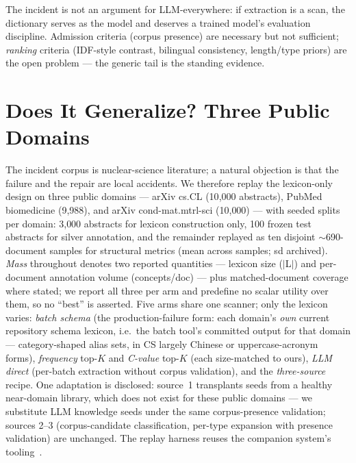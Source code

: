 \documentclass[sigconf,nonacm,anonymous]{acmart}
\begin{document}
The incident is not an argument for LLM-everywhere: if extraction is a
scan, the dictionary serves as the model and deserves a trained model's
evaluation discipline. Admission criteria (corpus presence) are
necessary but not sufficient; \emph{ranking} criteria (IDF-style
contrast, bilingual consistency, length/type priors) are the open
problem --- the generic tail is the standing evidence.

\section{Does It Generalize? Three Public Domains}\label{sec:xdomain}

The incident corpus is nuclear-science literature; a natural objection is
that the failure and the repair are local accidents. We therefore replay
the lexicon-only design on three public domains --- arXiv
cs.CL (10{,}000 abstracts), PubMed biomedicine (9{,}988), and arXiv
cond-mat.mtrl-sci (10{,}000) --- with seeded splits per domain:
3{,}000 abstracts for lexicon construction only, 100 frozen test
abstracts for silver annotation, and the remainder replayed as ten
disjoint ${\sim}$690-document samples for structural metrics (mean
across samples; sd archived). \emph{Mass} throughout denotes two
reported quantities --- lexicon size ($|$L$|$) and per-document
annotation volume (concepts/doc) --- plus matched-document coverage
where stated; we report all three per arm and predefine no scalar
utility over them, so no ``best'' is asserted. Five arms share one scanner; only the
lexicon varies: \emph{batch schema} (the production-failure form: each
domain's \emph{own} current repository schema lexicon, i.e.\ the batch
tool's committed output for that domain --- category-shaped alias
sets, in CS largely Chinese or uppercase-acronym forms),
\emph{frequency} top-$K$ and \emph{C-value} top-$K$ (each size-matched
to ours), \emph{LLM direct} (per-batch extraction without corpus
validation), and the \emph{three-source} recipe. One adaptation is
disclosed: source~1 transplants seeds from a healthy near-domain
library, which does not exist for these public domains --- we substitute
LLM knowledge seeds under the same corpus-presence validation; sources
2--3 (corpus-candidate classification, per-type expansion with presence
validation) are unchanged. The replay harness reuses the companion
system's tooling~\cite{companion}.
\end{document}
